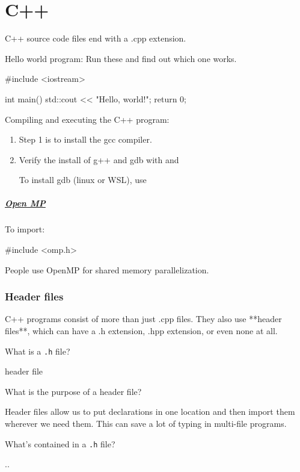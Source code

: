 
\chapter{C++}

C++ source code files end with a .cpp extension.

Hello world program: Run these and find out which one works.

\begin{cpp}
#include <iostream>

int main()
{
    std::cout << "Hello, world!";
    return 0;
}
\end{cpp}

Compiling and executing the C++ program:
\begin{enumerate}
\item
Step 1 is to install the gcc compiler.



\item
Verify the install of g++ and gdb with
 and 

To install gdb (linux or WSL), use 

\end{enumerate}


\paragraph*{\href{https://www.openmp.org//wp-content/uploads/openmp-examples-4.5.0.pdf}{Open MP}}

To import:
\begin{cpp}
#include <omp.h>
\end{cpp}

People use OpenMP for shared memory parallelization.


\subsection*{Header files}

C++ programs consist of more than just .cpp files. They also use **header files**, which can have a .h extension, .hpp extension, or even none at all.

\begin{quest}
\item What is a \texttt{.h} file?
\begin{ans}
header file
\end{ans}


\item What is the purpose of a header file?
\begin{ans}
Header files allow us to put declarations in one location and then import them wherever we need them. This can save a lot of typing in multi-file programs.
\end{ans}

\item What's contained in a \texttt{.h} file?
\begin{ans}
..
\end{ans}
\end{quest}


